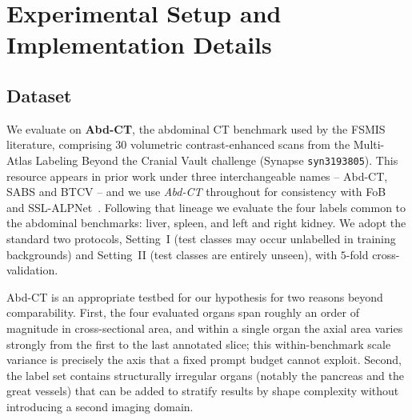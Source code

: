 %

\section{Experimental Setup and Implementation Details}
\label{sec:implementation}

\subsection{Dataset}
\label{subsec:dataset}

We evaluate on \textbf{Abd-CT}, the abdominal CT benchmark used by the FSMIS
literature, comprising $30$ volumetric contrast-enhanced scans from the
Multi-Atlas Labeling Beyond the Cranial Vault challenge (Synapse
\texttt{syn3193805}). This resource appears in prior work under three
interchangeable names -- Abd-CT, SABS and BTCV -- and we use \emph{Abd-CT}
throughout for consistency with FoB~\cite{bo2026fob} and
SSL-ALPNet~\cite{ouyang2020ssl}. Following that lineage we evaluate the four
labels common to the abdominal benchmarks: liver, spleen, and left and right
kidney. We adopt the standard two protocols, Setting~I (test classes may occur
unlabelled in training backgrounds) and Setting~II (test classes are entirely
unseen), with $5$-fold cross-validation.

Abd-CT is an appropriate testbed for our hypothesis for two reasons beyond
comparability. First, the four evaluated organs span roughly an order of
magnitude in cross-sectional area, and within a single organ the axial area
varies strongly from the first to the last annotated slice; this within-benchmark
scale variance is precisely the axis that a fixed prompt budget cannot exploit.
Second, the label set contains structurally irregular organs (notably the
pancreas and the great vessels) that can be added to stratify results by shape
complexity without introducing a second imaging domain.

